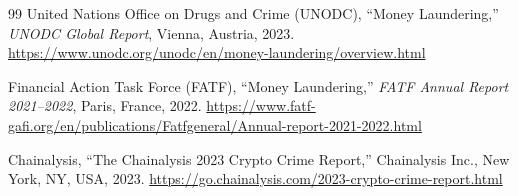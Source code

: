 \begin{thebibliography}{99}
United Nations Office on Drugs and Crime (UNODC),
``Money Laundering,''
\emph{UNODC Global Report}, Vienna, Austria, 2023.
\url{https://www.unodc.org/unodc/en/money-laundering/overview.html}

Financial Action Task Force (FATF),
``Money Laundering,''
\emph{FATF Annual Report 2021--2022}, Paris, France, 2022.
\url{https://www.fatf-gafi.org/en/publications/Fatfgeneral/Annual-report-2021-2022.html}

Chainalysis,
``The Chainalysis 2023 Crypto Crime Report,''
Chainalysis Inc., New York, NY, USA, 2023.
\url{https://go.chainalysis.com/2023-crypto-crime-report.html}

\end{thebibliography}
